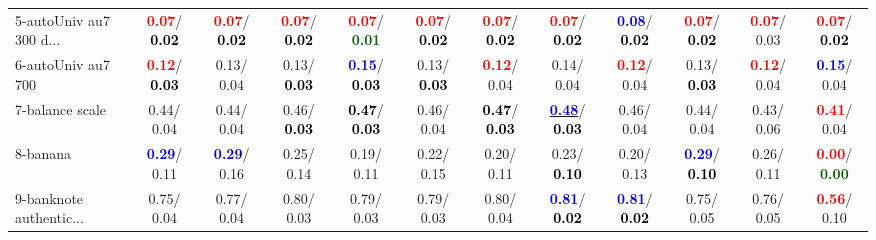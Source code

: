 \begin{table}[h]
\begin{center}
{\begin{tabular}{lc|c|c|c|c|c|c|c|c|c|c}
5-autoUniv au7 300 d... & \textcolor{red}{\textbf{  0.07}}/\textcolor{black}{\textbf{  0.02}} & \textcolor{red}{\textbf{  0.07}}/\textcolor{black}{\textbf{  0.02}} & \textcolor{red}{\textbf{  0.07}}/\textcolor{black}{\textbf{  0.02}} & \textcolor{red}{\textbf{  0.07}}/\textcolor{darkgreen}{\textbf{  0.01}} & \textcolor{red}{\textbf{  0.07}}/\textcolor{black}{\textbf{  0.02}} & \textcolor{red}{\textbf{  0.07}}/\textcolor{black}{\textbf{  0.02}} & \textcolor{red}{\textbf{  0.07}}/\textcolor{black}{\textbf{  0.02}} & \textcolor{blue}{\textbf{  0.08}}/\textcolor{black}{\textbf{  0.02}} & \textcolor{red}{\textbf{  0.07}}/\textcolor{black}{\textbf{  0.02}} & \textcolor{red}{\textbf{  0.07}}/  0.03 & \textcolor{red}{\textbf{  0.07}}/\textcolor{black}{\textbf{  0.02}} \\
6-autoUniv au7 700 & \textcolor{red}{\textbf{  0.12}}/\textcolor{black}{\textbf{  0.03}} &   0.13/  0.04 &   0.13/\textcolor{black}{\textbf{  0.03}} & \textcolor{blue}{\textbf{  0.15}}/\textcolor{black}{\textbf{  0.03}} &   0.13/\textcolor{black}{\textbf{  0.03}} & \textcolor{red}{\textbf{  0.12}}/  0.04 &   0.14/  0.04 & \textcolor{red}{\textbf{  0.12}}/  0.04 &   0.13/\textcolor{black}{\textbf{  0.03}} & \textcolor{red}{\textbf{  0.12}}/  0.04 & \textcolor{blue}{\textbf{  0.15}}/  0.04 \\
7-balance scale &   0.44/  0.04 &   0.44/  0.04 &   0.46/\textcolor{black}{\textbf{  0.03}} & \textcolor{black}{\textbf{  0.47}}/\textcolor{black}{\textbf{  0.03}} &   0.46/  0.04 & \textcolor{black}{\textbf{  0.47}}/\textcolor{black}{\textbf{  0.03}} & \underline{\textcolor{blue}{\textbf{  0.48}}}/\textcolor{black}{\textbf{  0.03}} &   0.46/  0.04 &   0.44/  0.04 &   0.43/  0.06 & \textcolor{red}{\textbf{  0.41}}/  0.04 \\ \hline
8-banana & \textcolor{blue}{\textbf{  0.29}}/  0.11 & \textcolor{blue}{\textbf{  0.29}}/  0.16 &   0.25/  0.14 &   0.19/  0.11 &   0.22/  0.15 &   0.20/  0.11 &   0.23/\textcolor{black}{\textbf{  0.10}} &   0.20/  0.13 & \textcolor{blue}{\textbf{  0.29}}/\textcolor{black}{\textbf{  0.10}} &   0.26/  0.11 & \textcolor{red}{\textbf{  0.00}}/\textcolor{darkgreen}{\textbf{  0.00}} \\
9-banknote authentic... &   0.75/  0.04 &   0.77/  0.04 &   0.80/  0.03 &   0.79/  0.03 &   0.79/  0.03 &   0.80/  0.04 & \textcolor{blue}{\textbf{  0.81}}/\textcolor{black}{\textbf{  0.02}} & \textcolor{blue}{\textbf{  0.81}}/\textcolor{black}{\textbf{  0.02}} &   0.75/  0.05 &   0.76/  0.05 & \textcolor{red}{\textbf{  0.56}}/  0.10 \\

\end{tabular}}
\end{center}
\end{table}
